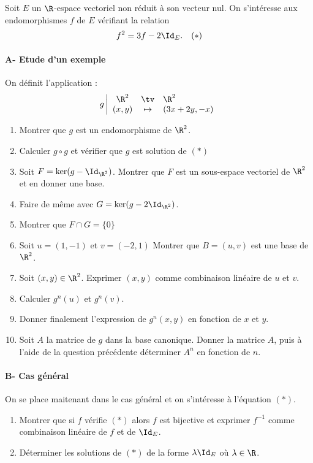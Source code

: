 \documentclass[a4paper, 11pt,reqno]{article}
\begin{document}
\vspace{2cm}
\begin{exercice}


Soit $E$ un  $\R$-espace vectoriel non réduit à son vecteur nul. On s'intéresse aux endomorphismes $f$ de $E$ vérifiant la relation 
$$f^2 =3f - 2\Id_E.\quad (*) $$
\paragraph{A- Etude d'un exemple}



On définit l'application : 
$$g \left| \begin{array}{ccl}
\R^2 &\tv& \R^2 \\
(x,y) &\mapsto & (3x+2y, -x)
\end{array}\right.$$
\begin{enumerate}
\item Montrer que $g$ est un endomorphisme de $\R^2$.
\item Calculer $g\circ g$ et vérifier que $g$ est solution de $(*)$
\item Soit $F =\ker(g-\Id_{\R^2}) $. Montrer que $F$ est un sous-espace vectoriel de $\R^2$ et  en  donner une base.
\item Faire de même avec $G =\ker(g- 2\Id_{\R^2}) $. 
\item Montrer que $F \cap G= \{ 0\}$ 
\item Soit $u =(1,-1) $ et  $v= (-2 , 1) $ Montrer que $B=(u,v) $ est une base de $\R^2$.
\item Soit $(x,y)\in \R^2$. Exprimer $(x,y) $ comme combinaison linéaire de $u$ et $v$.
\item Calculer $g^n(u)$ et $g^n(v)$. 
\item Donner finalement  l'expression de $g^n(x,y) $ en fonction de $x$ et $y$. 
\item Soit $A$ la matrice de $g$ dans la base canonique. Donner la matrice $A$, puis à l'aide de la question précédente déterminer  $A^n$ en fonction de $n$. 
\end{enumerate}
\paragraph{B- Cas général}
On se place maitenant dans le cas général et on s'intéresse à l'équation $(*)$.
\begin{enumerate}
\item Montrer que si $f$ vérifie $(*)$ alors $f$ est bijective et exprimer $f^{-1}$ comme combinaison linéaire de $f$ et de $ \Id_E$. 
\item Déterminer les solutions de $(*)$ de la forme $\lambda \Id_E$ où $\lambda \in \R$. 




\end{enumerate}
\end{exercice}
\end{document}
